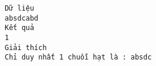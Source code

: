 \begin{verbatim}
Dữ liệu
absdcabd
Kết quả
1
Giải thích
Chỉ duy nhất 1 chuỗi hạt là : absdc
\end{verbatim}